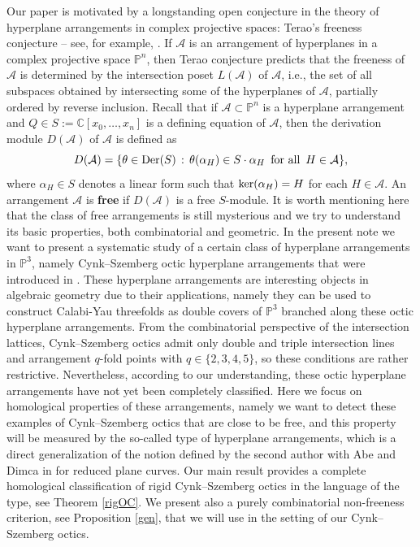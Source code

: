 \documentclass[11pt]{article}
\theoremstyle{plain}
\theoremstyle{definition}
\begin{document}
Our paper is motivated by a longstanding open conjecture in the theory of hyperplane arrangements in complex projective spaces: Terao's freeness conjecture -- see, for example, \cite{Dimca, Dimca1, terao}. If $\mathcal{A}$ is an arrangement of hyperplanes in a complex projective space $\mathbb{P}^{n}$, then Terao conjecture predicts that the freeness of $\mathcal{A}$ is determined by the intersection poset $L(\mathcal{A})$ of $\mathcal{A}$, i.e., the set of all subspaces obtained by intersecting some of the hyperplanes of $\mathcal{A}$, partially ordered by reverse inclusion. Recall that if $\mathcal{A} \subset \mathbb{P}^{n}$ is a hyperplane arrangement and $Q \in S:=\mathbb{C}[x_{0}, \ldots , x_{n}]$ is a defining equation of $\mathcal{A}$, then the derivation module $D(\mathcal{A})$ of $\mathcal{A}$ is defined as
$$D(\mathcal{A}) = \{\theta \in {\rm Der}(S) \, : \, \theta(\alpha_{H}) \in S \cdot \alpha_{H} \,\text{ for all } \, H \in \mathcal{A}\},$$
where $\alpha_{H} \in S$ denotes a linear form such that ${\rm ker}(\alpha_{H}) = H$ for each $H \in \mathcal{A}$. An arrangement $\mathcal{A}$ is \textbf{free} if $D(\mathcal{A})$ is a free $S$-module. It is worth mentioning here that the class of free arrangements is still mysterious and we try to understand its basic properties, both combinatorial and geometric.
In the present note we want to present a systematic study of a certain class of hyperplane arrangements in $\mathbb{P}^{3}$, namely Cynk--Szemberg octic hyperplane arrangements that were introduced in \cite{CSz}. These hyperplane arrangements are interesting objects in algebraic geometry due to their applications, namely they can be used to construct Calabi-Yau threefolds as double covers of $\mathbb{P}^{3}$ branched along these octic hyperplane arrangements. From the combinatorial perspective of the intersection lattices, Cynk--Szemberg octics admit only double and triple intersection lines and arrangement $q$-fold points with $q\in \{2,3,4,5\}$, so these conditions are rather restrictive. Nevertheless, according to our understanding, these octic hyperplane arrangements have not yet been completely classified. Here we focus on homological properties of these arrangements, namely we want to detect these examples of Cynk--Szemberg octics that are close to be free, and this property will be measured by the so-called type of hyperplane arrangements, which is a direct generalization of the notion defined by the second author with Abe and Dimca in \cite{her} for reduced plane curves. Our main result provides a complete homological classification of rigid Cynk--Szemberg octics in the language of the type, see Theorem \ref{rigOC}. We present also a purely combinatorial non-freeness criterion, see Proposition \ref{gen}, that we will use in the setting of our Cynk--Szemberg octics. 
\end{document}

